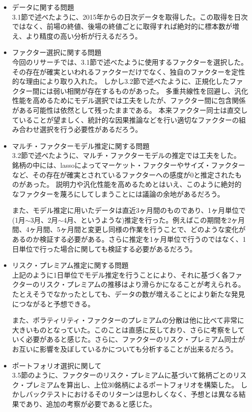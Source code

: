 \documentclass[11pt]{jreport}
\begin{document}
\begin{itemize}
\item{データに関する問題}\\
\quad 3.1節で述べたように、2015年からの日次データを取得した。この取得を日次ではなく、前場の終値、後場の終値ごとに取得すれば絶対的に標本数が増え、より精度の高い分析が行えるだろう。
\item{ファクター選択に関する問題}\\
\quad 今回のリサーチでは、3.1節で述べたように使用するファクターを選択した。
その存在が確実といわれるファクターだけでなく、独自のファクターを定性的な理由により取り入れた。
しかし3.2節で述べたように、正規化したファクター間には弱い相関が存在するものがあった。
多重共線性を回避し、汎化性能を高めるためにモデル選択では工夫をしたが、ファクター間に包含関係がある可能性は依然として残ったままである。
本来ファクター同士は直交していることが望ましく、統計的な因果推論などを行い適切なファクターの組み合わせ選択を行う必要性があるだろう。

\item{マルチ・ファクターモデル推定に関する問題}\\
\quad 3.2節で述べたように、マルチ・ファクターモデルの推定では工夫をした。
銘柄の中には、lassoによってマーケット・ファクターやサイズ・ファクターなど、その存在が確実とされているファクターへの感度が$0$と推定されたものがあった。
説明力や汎化性能を高めるためとはいえ、このように絶対的なファクターを蔑ろにしてしまうことには議論の余地があるだろう。

\quad また、モデル推定に用いたデータは直近3ヶ月間のものであり、1ヶ月単位で(1月$\sim$3月、2月$\sim$4月、というような)推定を行った。例えばこの期間を2ヶ月間、4ヶ月間、5ヶ月間と変更し同様の作業を行うことで、どのような変化があるのか検証する必要がある。さらに推定を1ヶ月単位で行うのではなく、1日単位で行った場合に関しても検証する必要があるだろう。
\item{リスク・プレミアム推定に関する問題}\\
\quad 上記のように1日単位でモデル推定を行うことにより、それに基づく各ファクターのリスク・プレミアムの推移はより滑らかになることが考えられる。
たとえそうでなかったとしても、データの数が増えることにより新たな発見につながると予想できる。

\quad また、ボラティリティ・ファクターのプレミアムの分散は他に比べて非常に大きいものとなっていた。このことは直感に反しており、さらに考察をしていく必要があると感じた。さらに、ファクターのリスク・プレミアム同士がお互いに影響を及ぼしているかについても分析することが出来るだろう。
\item{ポートフォリオ選択に関して}\\
\quad 3.5節のように、ファクターのリスク・プレミアムに基づいて銘柄ごとのリスク・プレミアムを算出し、上位30銘柄によるポートフォリオを構築した。
しかしバックテストにおけるそのリターンは思わしくなく、予想とは異なる結果であり、追加の考察が必要であると感じた。

\end{itemize}
\end{document}
